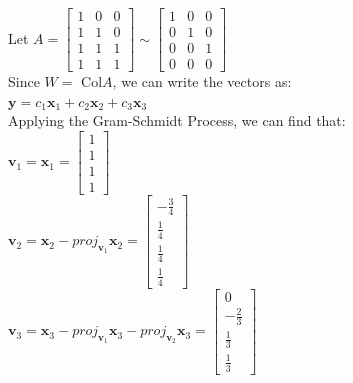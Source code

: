 \documentclass{report}
\begin{document}
\begin{center}
	Let $A = \begin{bmatrix}
		1 & 0 & 0 \\
		1 & 1 & 0 \\
		1 & 1 & 1 \\
		1 & 1 & 1 
	\end{bmatrix}\sim 
	\begin{bmatrix}
		1 & 0 & 0 \\
		0 & 1 & 0 \\
		0 & 0 & 1 \\
		0 & 0 & 0 
	\end{bmatrix}$\\\vspace{3mm}
	Since $W =$ Col$A$, we can write the vectors as:\\\vspace{3mm}
	$\mathbf{y}=c_1\mathbf{x}_1 + c_2\mathbf{x}_2 + c_3\mathbf{x}_3$\\\vspace{3mm}
	Applying the Gram-Schmidt Process, we can find that:\\\vspace{3mm}
	$\mathbf{v}_1 = \mathbf{x}_1 = \begin{bmatrix} 1 \\ 1 \\ 1 \\ 1 \end{bmatrix}$ \\\vspace{3mm}
	$\mathbf{v}_2 = \mathbf{x}_2 - proj_{\mathbf{v}_1}\mathbf{x}_2 = \begin{bmatrix} -\frac{3}{4} \\ \frac{1}{4} \\ \frac{1}{4} \\ \frac{1}{4} \end{bmatrix}$ \\\vspace{3mm}
	$\mathbf{v}_3 = \mathbf{x}_3 - proj_{\mathbf{v}_1}\mathbf{x}_3 - proj_{\mathbf{v}_2}\mathbf{x}_3 = \begin{bmatrix} 0 \\ -\frac{2}{3} \\ \frac{1}{3} \\ \frac{1}{3} \end{bmatrix}$ \\\vspace{3mm}

\end{center}
\end{document}
